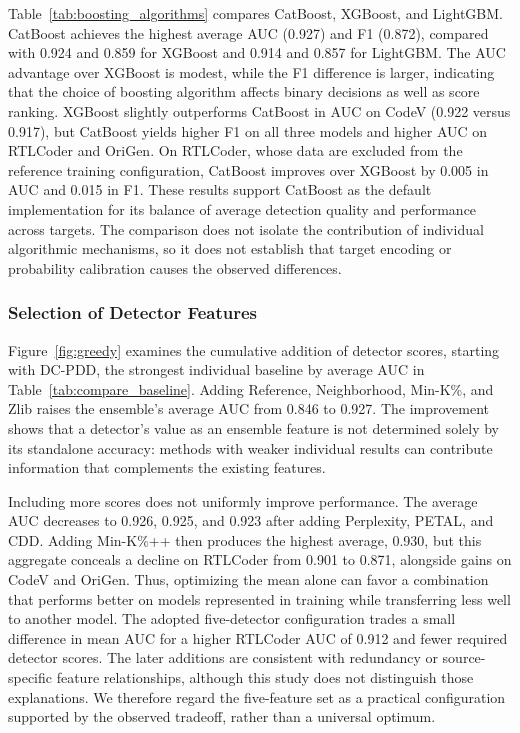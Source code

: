 Table~\ref{tab:boosting_algorithms} compares CatBoost, XGBoost, and LightGBM. CatBoost achieves the highest average AUC (0.927) and F1 (0.872), compared with 0.924 and 0.859 for XGBoost and 0.914 and 0.857 for LightGBM. The AUC advantage over XGBoost is modest, while the F1 difference is larger, indicating that the choice of boosting algorithm affects binary decisions as well as score ranking. XGBoost slightly outperforms CatBoost in AUC on CodeV (0.922 versus 0.917), but CatBoost yields higher F1 on all three models and higher AUC on RTLCoder and OriGen. On RTLCoder, whose data are excluded from the reference training configuration, CatBoost improves over XGBoost by 0.005 in AUC and 0.015 in F1. These results support CatBoost as the default implementation for its balance of average detection quality and performance across targets. The comparison does not isolate the contribution of individual algorithmic mechanisms, so it does not establish that target encoding or probability calibration causes the observed differences.

\subsubsection{Selection of Detector Features}
\label{sec:select}

Figure~\ref{fig:greedy} examines the cumulative addition of detector scores, starting with DC-PDD, the strongest individual baseline by average AUC in Table~\ref{tab:compare_baseline}. Adding Reference, Neighborhood, Min-K\%, and Zlib raises the ensemble's average AUC from 0.846 to 0.927. The improvement shows that a detector's value as an ensemble feature is not determined solely by its standalone accuracy: methods with weaker individual results can contribute information that complements the existing features.

Including more scores does not uniformly improve performance. The average AUC decreases to 0.926, 0.925, and 0.923 after adding Perplexity, PETAL, and CDD. Adding Min-K\%++ then produces the highest average, 0.930, but this aggregate conceals a decline on RTLCoder from 0.901 to 0.871, alongside gains on CodeV and OriGen. Thus, optimizing the mean alone can favor a combination that performs better on models represented in training while transferring less well to another model. The adopted five-detector configuration trades a small difference in mean AUC for a higher RTLCoder AUC of 0.912 and fewer required detector scores. The later additions are consistent with redundancy or source-specific feature relationships, although this study does not distinguish those explanations. We therefore regard the five-feature set as a practical configuration supported by the observed tradeoff, rather than a universal optimum.

